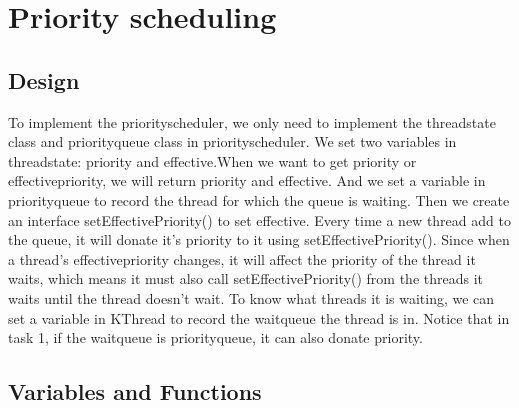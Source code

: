 \documentclass[a4paper,10pt]{article}
\begin{document}
\section{Priority scheduling}


\subsection{Design}

To implement the priorityscheduler, we only need to implement the threadstate class and priorityqueue class in priorityscheduler. We set two variables in threadstate: priority and effective.When we want to get priority or effectivepriority, we will return priority and effective.  And we set a variable in priorityqueue to record the thread for which the queue is waiting. Then we  create an interface setEffectivePriority() to set effective. Every time a new thread add to the queue, it will donate it's priority to it using setEffectivePriority(). Since when a thread's effectivepriority changes, it will affect the priority of the thread it waits, which means it must also call setEffectivePriority() from the threads it waits until the thread doesn't wait. To know what threads it is waiting, we can set a variable in KThread to record the waitqueue the thread is in. Notice that in task 1, if the waitqueue is priorityqueue, it can also donate priority.

\subsection{Variables and Functions}
\end{document}
